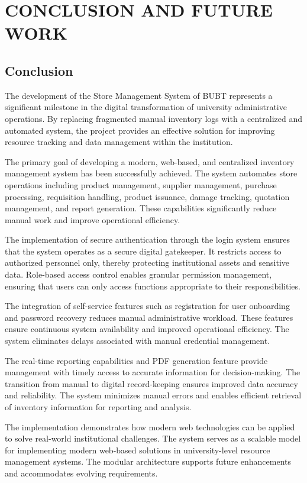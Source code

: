 \chapter{CONCLUSION AND FUTURE WORK}
\label{chap:conclusion}

\section{Conclusion}

The development of the Store Management System of BUBT represents a significant milestone in the digital transformation of university administrative operations. By replacing fragmented manual inventory logs with a centralized and automated system, the project provides an effective solution for improving resource tracking and data management within the institution.

The primary goal of developing a modern, web-based, and centralized inventory management system has been successfully achieved. The system automates store operations including product management, supplier management, purchase processing, requisition handling, product issuance, damage tracking, quotation management, and report generation. These capabilities significantly reduce manual work and improve operational efficiency.

The implementation of secure authentication through the login system ensures that the system operates as a secure digital gatekeeper. It restricts access to authorized personnel only, thereby protecting institutional assets and sensitive data. Role-based access control enables granular permission management, ensuring that users can only access functions appropriate to their responsibilities.

The integration of self-service features such as registration for user onboarding and password recovery reduces manual administrative workload. These features ensure continuous system availability and improved operational efficiency. The system eliminates delays associated with manual credential management.

The real-time reporting capabilities and PDF generation feature provide management with timely access to accurate information for decision-making. The transition from manual to digital record-keeping ensures improved data accuracy and reliability. The system minimizes manual errors and enables efficient retrieval of inventory information for reporting and analysis.

The implementation demonstrates how modern web technologies can be applied to solve real-world institutional challenges. The system serves as a scalable model for implementing modern web-based solutions in university-level resource management systems. The modular architecture supports future enhancements and accommodates evolving requirements.

